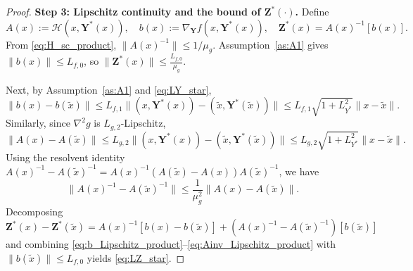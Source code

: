\documentclass[10pt,a4paper]{amsart}
\begin{document}
\begin{proof}
\textbf{Step 3: Lipschitz continuity and the bound of $\boldsymbol Z^*(\cdot)$. }
Define
\begin{equation*}
A(x):=\mathcal H(x,\boldsymbol Y^*(x)), \quad b(x):=\nabla_{\boldsymbol Y}f(x,\boldsymbol Y^*(x)), \quad \boldsymbol Z^*(x)=A(x)^{-1}[b(x)].
\end{equation*}
From \eqref{eq:H_sc_product}, $\|A(x)^{-1}\|\le 1/\mu_g$. Assumption~\ref{as:A1} gives $\|b(x)\|\le L_{f,0}$, so $\|\boldsymbol Z^*(x)\|\le \frac{L_{f,0}}{\mu_g}$.

Next, by Assumption~\ref{as:A1} and \eqref{eq:LY_star},
\begin{equation}\label{eq:b_Lipschitz_product}
\|b(x)-b(\tilde x)\|
\le
L_{f,1}\|(x,\boldsymbol Y^*(x))-(\tilde x,\boldsymbol Y^*(\tilde x))\|
\le
L_{f,1}\sqrt{1+L_{Y^*}^2}\|x-\tilde x\|.
\end{equation}
Similarly, since $\nabla^2 g$ is $L_{g,2}$-Lipschitz,
\begin{equation}\label{eq:A_Lipschitz_product}
\|A(x)-A(\tilde x)\|
\le
L_{g,2}\|(x,\boldsymbol Y^*(x))-(\tilde x,\boldsymbol Y^*(\tilde x))\|
\le
L_{g,2}\sqrt{1+L_{Y^*}^2}\|x-\tilde x\|.
\end{equation}
Using the resolvent identity $A(x)^{-1}-A(\tilde x)^{-1} = A(x)^{-1}(A(\tilde x)-A(x))A(\tilde x)^{-1}$, we have
\begin{equation}\label{eq:Ainv_Lipschitz_product}
\|A(x)^{-1}-A(\tilde x)^{-1}\|
\le
\frac{1}{\mu_g^2}\|A(x)-A(\tilde x)\|.
\end{equation}
Decomposing
\begin{equation*}
\boldsymbol Z^*(x)-\boldsymbol Z^*(\tilde x) = A(x)^{-1}[b(x)-b(\tilde x)] + (A(x)^{-1}-A(\tilde x)^{-1})[b(\tilde x)]
\end{equation*}
and combining \eqref{eq:b_Lipschitz_product}--\eqref{eq:Ainv_Lipschitz_product} with $\|b(\tilde x)\|\le L_{f,0}$ yields \eqref{eq:LZ_star}.


\end{proof}
\end{document}
